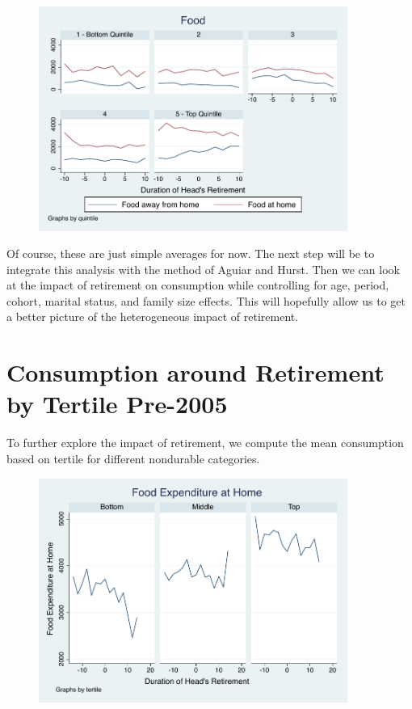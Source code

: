 \documentclass[11pt,onecolumn]{article}
\numberwithin{figure}{section}
\begin{document}
\begin{figure}[h]
	\centering
	\includegraphics[width=0.9\textwidth]{../ConsumptionPostRetirement/food.pdf}
\end{figure}


Of course, these are just simple averages for now. The next step will be to integrate this analysis with the method of Aguiar and Hurst. Then we can look at the impact of retirement on consumption while controlling for age, period, cohort, marital status, and family size effects. This will hopefully allow us to get a better picture of the heterogeneous impact of retirement.

\section{Consumption around Retirement by Tertile Pre-2005}

To further explore the impact  of retirement, we compute the mean consumption based on tertile for different nondurable categories. 

\begin{figure}[h]
	\centering
	\includegraphics[width=0.9\textwidth]{../ConsumptionPostRetirement/Tertile_1/total_foodexp_home_real.pdf}
\end{figure}
\end{document}
